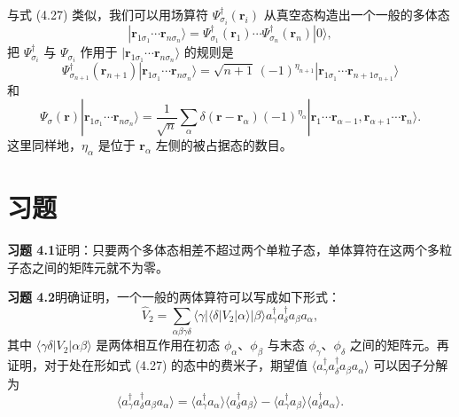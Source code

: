 与式 (4.27) 类似，我们可以用场算符 $\Psi_{\sigma_i}^\dagger(\mathbf{r}_i)$ 从真空态构造出一个一般的多体态
\begin{equation*}
|\mathbf{r}_{1\sigma_1}\cdots\mathbf{r}_{n\sigma_n}\rangle=\Psi_{\sigma_1}^\dagger(\mathbf{r}_1)\cdots\Psi_{\sigma_n}^\dagger(\mathbf{r}_n)|0\rangle,
\tag{4.38}
\end{equation*}
把 $\Psi_{\sigma_i}^\dagger$ 与 $\Psi_{\sigma_i}$ 作用于 $|\mathbf{r}_{1\sigma_1}\cdots\mathbf{r}_{n\sigma_n}\rangle$ 的规则是
\begin{equation*}
\Psi_{\sigma_{n+1}}^\dagger(\mathbf{r}_{n+1})|\mathbf{r}_{1\sigma_1}\cdots\mathbf{r}_{n\sigma_n}\rangle=\sqrt{n+1}\,(-1)^{\eta_{n+1}}|\mathbf{r}_{1\sigma_1}\cdots\mathbf{r}_{n+1\sigma_{n+1}}\rangle
\tag{4.39}
\end{equation*}
和
\begin{equation*}
\Psi_\sigma(\mathbf{r})|\mathbf{r}_{1\sigma_1}\cdots\mathbf{r}_{n\sigma_n}\rangle=\frac{1}{\sqrt{n}}\sum_\alpha\delta(\mathbf{r}-\mathbf{r}_\alpha)(-1)^{\eta_\alpha}|\mathbf{r}_1\cdots\mathbf{r}_{\alpha-1},\mathbf{r}_{\alpha+1}\cdots\mathbf{r}_n\rangle.
\tag{4.40}
\end{equation*}
这里同样地，$\eta_\alpha$ 是位于 $\mathbf{r}_\alpha$ 左侧的被占据态的数目。

\section*{习题}

\textbf{习题 4.1}\quad 证明：只要两个多体态相差不超过两个单粒子态，单体算符在这两个多粒子态之间的矩阵元就不为零。

\textbf{习题 4.2}\quad 明确证明，一个一般的两体算符可以写成如下形式：
\begin{equation*}
\widehat{V}_2=\sum_{\alpha\beta\gamma\delta}\langle\gamma|\langle\delta|V_2|\alpha\rangle|\beta\rangle a_\gamma^\dagger a_\delta^\dagger a_\beta a_\alpha,
\end{equation*}
其中 $\langle\gamma\delta|V_2|\alpha\beta\rangle$ 是两体相互作用在初态 $\phi_\alpha$、$\phi_\beta$ 与末态 $\phi_\gamma$、$\phi_\delta$ 之间的矩阵元。再证明，对于处在形如式 (4.27) 的态中的费米子，期望值 $\langle a_\gamma^\dagger a_\delta^\dagger a_\beta a_\alpha\rangle$ 可以因子分解为
\begin{equation*}
\langle a_\gamma^\dagger a_\delta^\dagger a_\beta a_\alpha\rangle=\langle a_\gamma^\dagger a_\alpha\rangle\langle a_\delta^\dagger a_\beta\rangle-\langle a_\gamma^\dagger a_\beta\rangle\langle a_\delta^\dagger a_\alpha\rangle.
\end{equation*}

